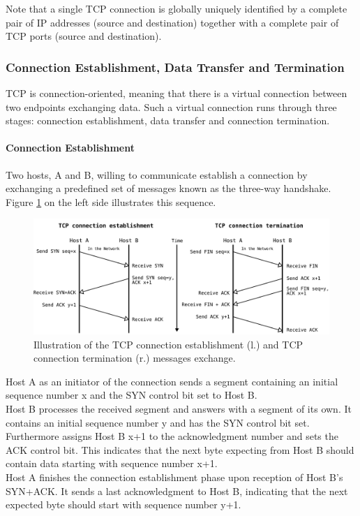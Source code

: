 Note that a single TCP connection is globally uniquely identified by a complete pair of IP addresses (source and destination) together with a complete pair of TCP ports (source and destination).

\subsubsection{Connection Establishment, Data Transfer and Termination}

TCP is connection-oriented, meaning that there is a virtual connection between two endpoints exchanging data. Such a virtual connection runs through three stages: connection establishment, data transfer and connection termination.

\paragraph{Connection Establishment}

Two hosts, A and B, willing to communicate establish a connection by exchanging a predefined set of messages known as the three-way handshake. Figure \ref{fig:TCPConnectionEstablishmentAndTermination} on the left side illustrates this sequence. 

\begin{figure}[H]
	\begin{center} 
		\def\svgwidth{1\textwidth}
		\includegraphics[scale=0.24]{../illustrations/importantConcepts/TCPHandshake.pdf} 
		\caption[Caption for the list of figures.]{Illustration of the TCP connection establishment (l.) and TCP connection termination (r.) messages exchange.}
		\label{fig:TCPConnectionEstablishmentAndTermination}
	\end{center}
\end{figure}

Host A as an initiator of the connection sends a segment containing an initial sequence number x and the SYN control bit set to Host B. \smallskip\\Host B processes the received segment and answers with a segment of its own. It contains an initial sequence number y and has the SYN control bit set. Furthermore assigns Host B x+1 to the acknowledgment number and sets the ACK control bit. This indicates that the next byte expecting from Host B should contain data starting with sequence number x+1. \smallskip\\ Host A finishes the connection establishment phase upon reception of Host B's SYN+ACK. It sends a last acknowledgment to Host B, indicating that the next expected byte should start with sequence number y+1.

